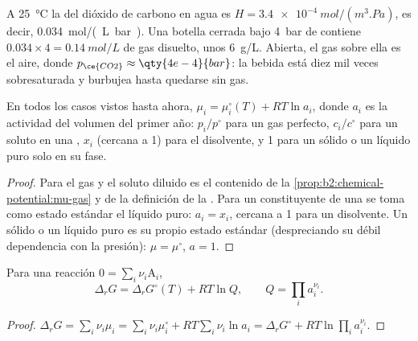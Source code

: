 \begin{example}\label{ex:b2:chemical-potential:soda}
A \qty{25}{\celsius} la  del dióxido de carbono en agua es $H =
\qty{3.4e-4}{mol/(m^3.Pa)}$, es decir, \qty{0.034}{mol/(L.bar)}. Una botella
cerrada bajo \qty{4}{bar} de  contiene $0.034 \times 4 =
\qty{0.14}{mol/L}$ de gas disuelto, unos \qty{6}{g/L}. Abierta, el gas
sobre ella es el aire, donde $p_{\ce{CO2}} \approx \qty{4e-4}{bar}$: la bebida está
diez mil veces sobresaturada y burbujea hasta quedarse sin gas.
\end{example}

\begin{proposition}\label{prop:b2:chemical-potential:activity}
En todos los casos vistos hasta ahora, $\mu_i = \mu_i^\circ(T) + RT\ln a_i$, donde $a_i$
es la actividad del volumen del primer año: $p_i/p^\circ$ para un gas perfecto,
$c_i/c^\circ$ para un soluto en una , $x_i$ (cercana a 1)
para el disolvente, y 1 para un sólido o un líquido puro solo en su fase.
\end{proposition}

\begin{proof}
Para el gas y el soluto diluido es el contenido de la
\cref{prop:b2:chemical-potential:mu-gas} y de la definición de la . Para un constituyente de una  se toma como estado
estándar el líquido puro: $a_i = x_i$, cercana a 1 para un disolvente. Un sólido
o un líquido puro es su propio estado estándar (despreciando su débil dependencia con la
presión): $\mu = \mu^\circ$, $a = 1$.
\end{proof}

\begin{proposition}\label{prop:b2:chemical-potential:delta-g-q}
Para una reacción $0 = \sum_i\nu_i\mathrm A_i$,
\[
  \Delta_r G = \Delta_r G^\circ(T) + RT\ln Q, \qquad Q = \prod_i a_i^{\nu_i} .
\]
\end{proposition}

\begin{proof}
$\Delta_r G = \sum_i\nu_i\mu_i = \sum_i\nu_i\mu_i^\circ + RT\sum_i\nu_i\ln a_i =
\Delta_r G^\circ + RT\ln\prod_i a_i^{\nu_i}$.
\end{proof}

